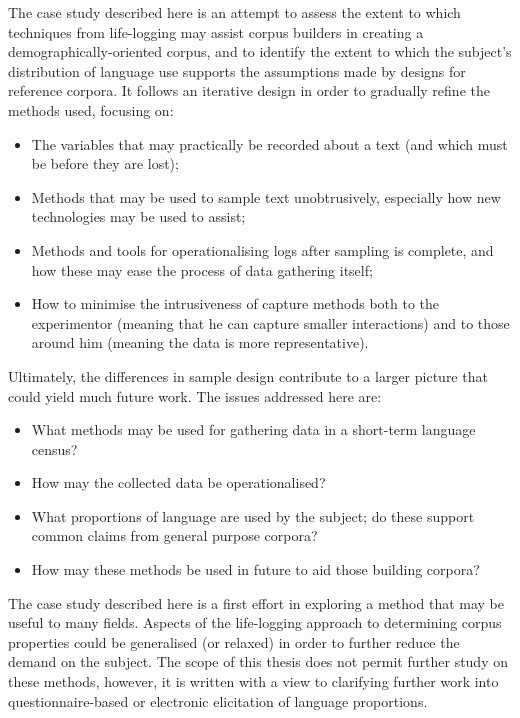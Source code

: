 
The case study described here is an attempt to assess the extent to which techniques from life-logging may assist corpus builders in creating a demographically-oriented corpus, and to identify the extent to which the subject's distribution of language use supports the assumptions made by designs for reference corpora.  It follows an iterative design in order to gradually refine the methods used, focusing on:

\begin{itemize}
    \item The variables that may practically be recorded about a text (and which must be before they are lost);
    \item Methods that may be used to sample text unobtrusively, especially how new technologies may be used to assist;
    \item Methods and tools for operationalising logs after sampling is complete, and how these may ease the process of data gathering itself;
    \item How to minimise the intrusiveness of capture methods both to the experimentor (meaning that he can capture smaller interactions) and to those around him (meaning the data is more representative).
\end{itemize}

Ultimately, the differences in sample design contribute to a larger picture that could yield much future work.  The issues addressed here are:

\begin{itemize}
    \item What methods may be used for gathering data in a short-term language census?
    \item How may the collected data be operationalised?
    \item What proportions of language are used by the subject; do these support common claims from general purpose corpora?
    \item How may these methods be used in future to aid those building corpora?
\end{itemize}


The case study described here is a first effort in exploring a method that may be useful to many fields.  Aspects of the life-logging approach to determining corpus properties could be generalised (or relaxed) in order to further reduce the demand on the subject.  The scope of this thesis does not permit further study on these methods, however, it is written with a view to clarifying further work into questionnaire-based or electronic elicitation of language proportions.






